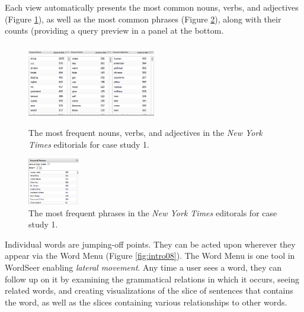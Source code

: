 \documentclass{sig-alternate}
\begin{document}
Each view automatically presents the most common nouns, verbs, and adjectives (Figure \ref{fig:intro06}), as well as the most common phrases (Figure \ref{fig:intro07}), along with their counts (providing a query preview \cite{shneiderman} in a panel at the bottom.    
\begin{figure}[ht!]
\begin{center}
	\includegraphics[width=0.5\textwidth]{fig/intro/06a.png}
	\includegraphics[width=0.5\textwidth]{fig/intro/06.png}
\end{center}
    \caption{%
       The most frequent nouns, verbs, and adjectives in the \emph{New York Times} editorials for case study 1.  \label{fig:intro06}
     }%
\end{figure}

\begin{figure}[ht!]
\begin{center}
	\includegraphics[width=0.2\textwidth]{fig/intro/07.png}
\end{center}
    \caption{%
       The most frequent phrases in the \emph{New York Times} editorals for case study 1. \label{fig:intro07}
     }%
\end{figure}

Individual words are jumping-off points. They can be acted upon wherever they appear via the Word Menu (Figure \ref{fig:intro08}). The Word Menu is one tool in  WordSeer enabling \emph{lateral movement}.  Any time a user sees a word, they can follow up on it by examining the grammatical relations in which it occurs, seeing related words,  and creating visualizations of the slice of sentences that contains the word, as well as the slices containing various relationships to other words.
\end{document}
